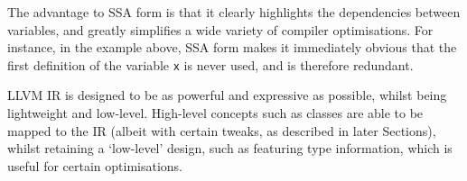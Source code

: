 The advantage to SSA form is that it clearly highlights the dependencies between variables, and greatly simplifies a wide variety of compiler optimisations. For instance, in the example above, SSA form makes it immediately obvious that the first definition of the variable \verb|x| is never used, and is therefore redundant.

LLVM IR is designed to be as powerful and expressive as possible, whilst being lightweight and low-level. High-level concepts such as classes are able to be mapped to the IR (albeit with certain tweaks, as described in later Sections), whilst retaining a `low-level' design, such as featuring type information, which is useful for certain optimisations.
